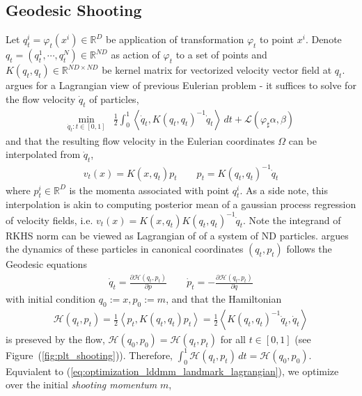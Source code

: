 \documentclass{6838publ}
\newcommand\sH{\ensuremath{\mathcal{H}}}
\newcommand\sL{\ensuremath{\mathcal{L}}}
\newcommand\R{\ensuremath{\mathbb{R}}} %
\newcommand\inner[2]{\ensuremath{\left< #1, #2 \right>}} %
\begin{document}
\subsection{Geodesic Shooting}

Let $q_t^i = \varphi_t(x^i) \in \R^D$ be application of transformation $\varphi_t$ to point $x^i$. Denote $q_t = (q_t^1, \cdots, q_t^N) \in \R^{ND}$ as action of $\varphi_t$ to a set of points and $K(q_t,q_t) \in \R^{ND\times ND}$ be kernel matrix for vectorized velocity vector field at $q_t$. \cite{joshiLandmarkMatchingLarge2000} argues for a Lagrangian view of previous Eulerian problem - it suffices to solve for the flow velocity $\dot{q}_t$ of particles,
\begin{align}
    \min_{\dot{q}_t:t\in [0,1]}
        &\frac{1}{2} \int_0^1 \inner{\dot{q}_t}{K(q_t,q_t)^{-1}\dot{q}_t} \, dt + \sL(\varphi_\sharp \alpha, \beta)
    \label{eq:optimization_lddmm_landmark_lagrangian}
\end{align}
and that the resulting flow velocity in the Eulerian coordinates $\Omega$ can be interpolated from $\dot{q}_t$,
\begin{align}
    v_t(x)
        = K(x, q_t) p_t
    \quad\quad
    p_t
        = K(q_t, q_t)^{-1} \dot{q}_t
\end{align}
where $p_t^i \in \R^{D}$ is the momenta associated with point $q_t^i$. As a side note, this interpolation is akin to computing posterior mean of a gaussian process regression of velocity fields, i.e. $v_t(x) = K(x,q_t) K(q_t,q_t)^{-1} \dot{q}_t$. Note the integrand of RKHS norm can be viewed as Lagrangian of of a system of ND particles. \cite{millerGeodesicShootingComputational2006} argues the dynamics of these particles in canonical coordinates $(q_t,p_t)$ follows the Geodesic equations
\begin{align}
    \dot{q}_t
        = \frac{\partial \sH(q_t,p_t)}{\partial p}
    \quad\quad
    \dot{p}_t
        = - \frac{\partial \sH(q_t,p_t)}{\partial q}
    \label{eq:geodesic_equations}
\end{align}
with initial condition $q_0 := x, p_0 := m$, and that the Hamiltonian 
\begin{align}
    \sH(q_t,p_t) = \frac{1}{2}\inner{p_t}{K(q_t,q_t)p_t} = \frac{1}{2}\inner{K(q_t,q_t)^{-1}\dot{q}_t}{\dot{q}_t}  
\end{align}
is preseved by the flow, $\sH(q_0,p_0)  = \sH(q_t,p_t)$ for all $t\in [0,1]$ (see Figure~(\ref{fig:plt_shooting})). Therefore, $\int_0^1 \sH(q_t,p_t) \, dt = \sH(q_0, p_0)$. Equvialent to (\ref{eq:optimization_lddmm_landmark_lagrangian}), we optimize over the initial \textit{shooting momentum} $m$,
\end{document}
